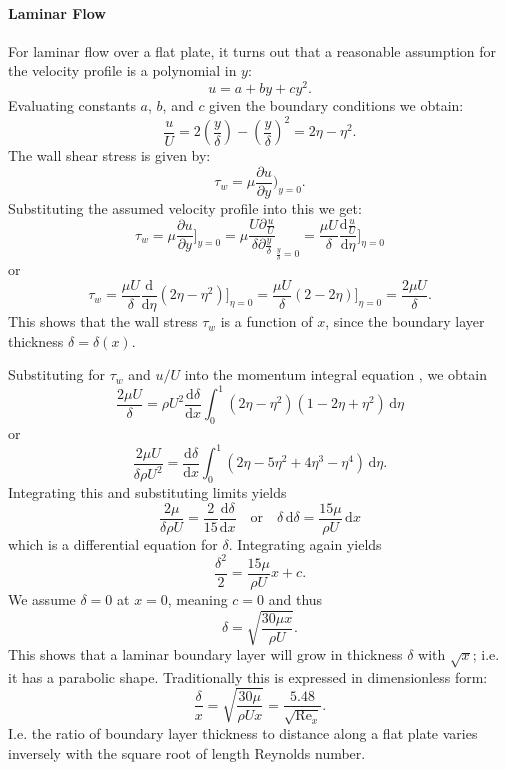 \paragraph{Laminar Flow}
For laminar flow over a flat plate, it turns out that a reasonable assumption for the velocity profile is a polynomial in $y$:
\[ 
u = a + by + cy^2
.\]
Evaluating constants $a$, $b$, and $c$ given the boundary conditions we obtain:
\[ 
\frac{u}{U} = 2 \left( \frac{y}{\delta} \right) - \left( \frac{y}{\delta} \right)^2 = 2 \eta - \eta^2
.\]
The wall shear stress is given by:
\[ 
\tau_w = \mu \frac{\partial u}{\partial y} \Bigg)_{y = 0}
.\]
Substituting the assumed velocity profile into this we get:
\[ 
\tau_w = \mu \frac{\partial u}{\partial y} \Bigg]_{y = 0} = \mu \frac{U \partial \frac{u}{U}}{\delta \partial \frac{y}{\delta}}_{\frac{y}{\delta} = 0} = \frac{\mu U}{\delta} \frac{\mathrm{d}\frac{u}{U}}{\mathrm{d}\eta} \Bigg]_{\eta = 0}
\]
or
\[ 
\tau_w = \frac{\mu U }{\delta} \frac{\mathrm{d}}{\mathrm{d}\eta} \left( 2 \eta - \eta^2 \right) \Bigg]_{\eta = 0} = \frac{\mu U }{\delta} \left( 2 - 2\eta \right) \Bigg]_{\eta = 0} = \frac{2\mu U}{\delta}
.\]
This shows that the wall stress $\tau_w$ is a function of $x$, since the boundary layer thickness $\delta = \delta(x)$.

Substituting for $\tau_w$ and $u / U$ into the momentum integral equation , we obtain
\[ 
\frac{2\mu U}{\delta} = \rho U^2 \frac{\mathrm{d}\delta}{\mathrm{d}x} \int_{0}^{1} \left( 2\eta - \eta^2 \right) \left( 1 - 2\eta + \eta^2 \right)\, \mathrm{d}\eta
\]
or
\[ 
\frac{2 \mu U}{\delta \rho U^2} = \frac{\mathrm{d}\delta}{\mathrm{d}x} \int_{0}^{1} \left( 2 \eta - 5 \eta^2 + 4 \eta^3 - \eta^{4} \right)\, \mathrm{d}\eta
.\]
Integrating this and substituting limits yields
\[ 
\frac{2\mu}{\delta \rho U} = \frac{2}{15} \frac{\mathrm{d}\delta}{\mathrm{d}x} \quad \text{or} \quad \delta \, \mathrm{d}\delta = \frac{15\mu}{\rho U}\, \mathrm{d}x 
\]
which is a differential equation for $\delta$.
Integrating again yields
\[ 
\frac{\delta^2}{2} = \frac{15\mu}{\rho U }x + c
.\]
We assume $\delta = 0$ at $x = 0$, meaning $c = 0$ and thus
\[ 
\delta = \sqrt{\frac{30\mu x}{\rho U}}
.\]
This shows that a laminar boundary layer will grow in thickness $\delta$ with $\sqrt{x}$; i.e. it has a parabolic shape.
Traditionally this is expressed in dimensionless form:
\[ 
\frac{\delta}{x} = \sqrt{\frac{30\mu}{\rho U x}} = \frac{\num{5,48} }{\sqrt{\mathrm{Re}_x}}
.\]
I.e. the ratio of boundary layer thickness to distance along a flat plate varies inversely with the square root of length Reynolds number.

